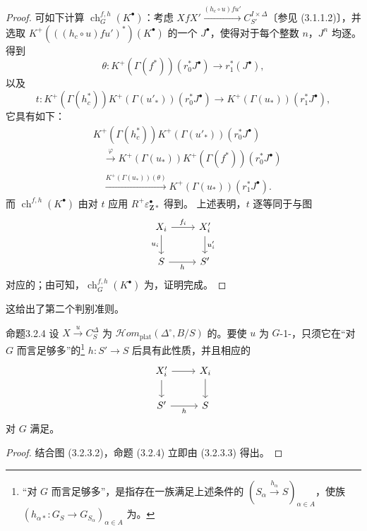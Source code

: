 \begin{proof}
可如下计算 $\operatorname{ch}_G^{f,h}(K^\bullet)$：考虑
$XfX'\xrightarrow{(h_c\circ u)fu'}C_{S'}^{I\times\Delta}$〔参见 (3.1.1.2)〕，并选取 $K^+(((h_c\circ u)fu')^*)(K^\bullet)$ 的一个 $J^\bullet$，使得对于每个整数 $n$，$J^n$ 均逐。
得到
\[
\theta:K^+(\Gamma(f^*))(r_0^*J^\bullet)\longrightarrow r_1^*(J^\bullet),
\]
以及
\[
t:K^+(\Gamma(h_c^*))K^+(\Gamma(u'_*))(r_0^*J^\bullet)
\longrightarrow K^+(\Gamma(u_*))(r_1^*J^\bullet),
\]
它具有如下：
\[
\begin{aligned}
{}&K^+(\Gamma(h_c^*))K^+(\Gamma(u'_*))(r_0^*J^\bullet)\\
&\quad\xrightarrow{\varphi}K^+(\Gamma(u_*))K^+(\Gamma(f^*))(r_0^*J^\bullet)\\
&\quad\xrightarrow{K^+(\Gamma(u_*))(\theta)}K^+(\Gamma(u_*))(r_1^*J^\bullet).
\end{aligned}
\]
而 $\operatorname{ch}^{f,h}(K^\bullet)$ 由对 $t$ 应用 $R^+\varepsilon_{\mathbf Z*}^\bullet$ 得到。
上述表明，$t$ 逐等同于与图
\[
\begin{tikzcd}
X_i\arrow[r,"f_i"]\arrow[d,"u_i"']&X'_i\arrow[d,"u'_i"]\\
S\arrow[r,"h"']&S'
\end{tikzcd}
\]
对应的；由可知，$\operatorname{ch}_G^{f,h}(K^\bullet)$ 为，证明完成。
\end{proof}
这给出了第二个判别准则。
\begin{SGAresult}{命题}{3.2.4}
设 $X\xrightarrow{u}C_S^\Delta$ 为 $\mathcal{H}om_{\mathrm{plat}}(\Delta^\circ,B/S)$ 的。要使 $u$ 为 $G$-1-，只须它在“对 $G$ 而言足够多”的\footnote{“对 $G$ 而言足够多”，是指存在一族满足上述条件的 $(S_\alpha\xrightarrow{h_\alpha}S)_{\alpha\in A}$，使族 $(h_{\alpha*}:G_S\to G_{S_\alpha})_{\alpha\in A}$ 为。} $h:S'\to S$ 后具有此性质，并且相应的
\[
\begin{tikzcd}
X'_i\arrow[r]\arrow[d]&X_i\arrow[d]\\
S'\arrow[r,"h"']&S
\end{tikzcd}
\]
对 $G$ 满足。
\end{SGAresult}
\begin{proof}
结合图 (3.2.3.2)，命题 (3.2.4) 立即由 (3.2.3.3) 得出。
\end{proof}

